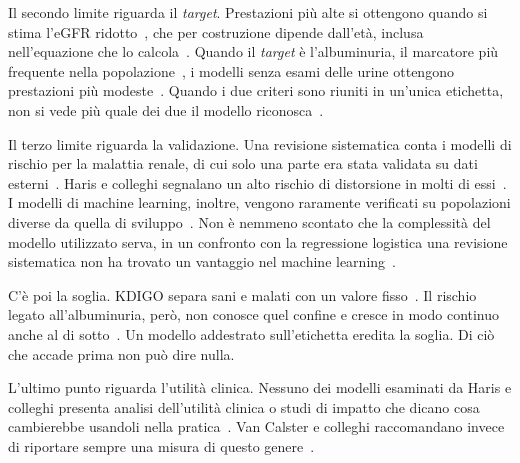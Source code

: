 \documentclass[a4paper, 12pt, oneside]{book}
\begin{document}
Il secondo limite riguarda il \textit{target}. Prestazioni più alte si ottengono quando si stima l'eGFR ridotto~\cite{bang_screening_2007,sabanayagam_deep_2020}, che per costruzione dipende dall'età, inclusa nell'equazione che lo calcola~\cite{inker_new_2021}. Quando il \textit{target} è l'albuminuria, il marcatore più frequente nella popolazione~\cite{wang_prevalence_2023}, i modelli senza esami delle urine ottengono prestazioni più modeste~\cite{bragg-gresham_using_2025,muntner_development_2011}. Quando i due criteri sono riuniti in un'unica etichetta, non si vede più quale dei due il modello riconosca~\cite{yoo_merwacs_2026}.

Il terzo limite riguarda la validazione. Una revisione sistematica conta i modelli di rischio per la malattia renale, di cui solo una parte era stata validata su dati esterni~\cite{echouffo-tcheugui_risk_2012}. Haris e colleghi segnalano un alto rischio di distorsione in molti di essi~\cite{haris_prediction_2024}. I modelli di machine learning, inoltre, vengono raramente verificati su popolazioni diverse da quella di sviluppo~\cite{sanmarchi_predict_2023}. Non è nemmeno scontato che la complessità del modello utilizzato serva, in un confronto con la regressione logistica una revisione sistematica non ha trovato un vantaggio nel machine learning~\cite{christodoulou_systematic_2019}.

C'è poi la soglia. KDIGO separa sani e malati con un valore fisso~\cite{stevens_kdigo_2024}. Il rischio legato all'albuminuria, però, non conosce quel confine e cresce in modo continuo anche al di sotto~\cite{matsushita_association_2010}. Un modello addestrato sull'etichetta eredita la soglia. Di ciò che accade prima non può dire nulla.

L'ultimo punto riguarda l'utilità clinica. Nessuno dei modelli esaminati da Haris e colleghi presenta analisi dell'utilità clinica o studi di impatto che dicano cosa cambierebbe usandoli nella pratica~\cite{haris_prediction_2024}. Van Calster e colleghi raccomandano invece di riportare sempre una misura di questo genere~\cite{van_calster_evaluation_2025}.
\end{document}

